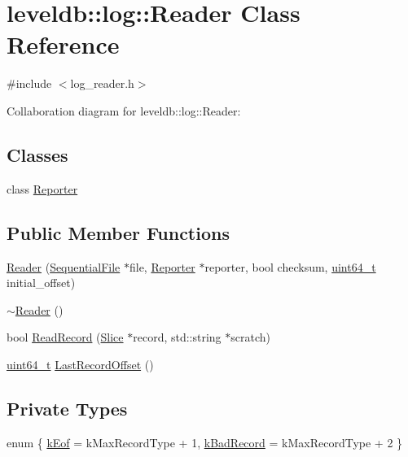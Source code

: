 \hypertarget{classleveldb_1_1log_1_1_reader}{\section{leveldb\-:\-:log\-:\-:Reader Class Reference}
\label{classleveldb_1_1log_1_1_reader}
}


{\ttfamily \#include $<$log\-\_\-reader.\-h$>$}



Collaboration diagram for leveldb\-:\-:log\-:\-:Reader\-:
\subsection*{Classes}
\begin{DoxyCompactItemize}
\item 
class \hyperlink{classleveldb_1_1log_1_1_reader_1_1_reporter}{Reporter}
\end{DoxyCompactItemize}
\subsection*{Public Member Functions}
\begin{DoxyCompactItemize}
\item 
\hyperlink{classleveldb_1_1log_1_1_reader_a38c1a9988741af5429dad60cf79f0556}{Reader} (\hyperlink{classleveldb_1_1_sequential_file}{Sequential\-File} $\ast$file, \hyperlink{classleveldb_1_1log_1_1_reader_1_1_reporter}{Reporter} $\ast$reporter, bool checksum, \hyperlink{stdint_8h_aaa5d1cd013383c889537491c3cfd9aad}{uint64\-\_\-t} initial\-\_\-offset)
\item 
\hyperlink{classleveldb_1_1log_1_1_reader_a52bc3896f8a0baee92f8c699553e7841}{$\sim$\-Reader} ()
\item 
bool \hyperlink{classleveldb_1_1log_1_1_reader_a84059598c9367cb677a9d70d77993282}{Read\-Record} (\hyperlink{classleveldb_1_1_slice}{Slice} $\ast$record, std\-::string $\ast$scratch)
\item 
\hyperlink{stdint_8h_aaa5d1cd013383c889537491c3cfd9aad}{uint64\-\_\-t} \hyperlink{classleveldb_1_1log_1_1_reader_a358c5545069d86a61948ac0a021aa7f6}{Last\-Record\-Offset} ()
\end{DoxyCompactItemize}
\subsection*{Private Types}
\begin{DoxyCompactItemize}
\item 
enum \{ \hyperlink{classleveldb_1_1log_1_1_reader_ad7bef0b8e83895e4145cd9c726482c31a092b38252c5b000ba43b38729810ef14}{k\-Eof} = k\-Max\-Record\-Type + 1, 
\hyperlink{classleveldb_1_1log_1_1_reader_ad7bef0b8e83895e4145cd9c726482c31a82ce7f7fb8f153b170a640fe29384cfd}{k\-Bad\-Record} = k\-Max\-Record\-Type + 2
 \}
\end{DoxyCompactItemize}
